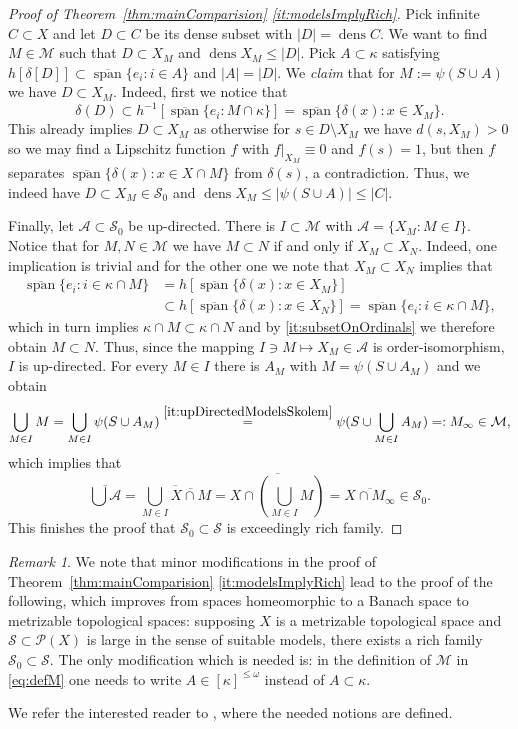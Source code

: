 \documentclass[11pt]{amsart}
\theoremstyle{definition}
\theoremstyle{remark}
\newtheorem{remark}[thm]{Remark}
\newcommand{\A}{\mathcal A}
\newcommand{\M}{\mathcal M}
\newcommand{\PP}{\mathcal P}
\newcommand{\SSS}{\mathcal S}
\newcommand{\closedSpan}{\overline{\operatorname{span}}}
\def \dens {\operatorname{dens}}
\begin{document}
\begin{proof}[Proof of Theorem~\ref{thm:mainComparision} \eqref{it:modelsImplyRich}]
Pick infinite $C\subset X$ and let $D\subset C$ be its dense subset with $|D| = \dens C$. We want to find $M\in\M$ such that $D\subset X_M$ and $\dens X_M\leq |D|$. Pick $A\subset \kappa$ satisfying $h[\delta[D]]\subset \closedSpan\{e_i\colon i\in A\}$ and $|A| = |D|$. We \emph{claim} that for $M:=\psi(S\cup A)$ we have $D\subset X_M$. Indeed, first we notice that
\[
\delta(D)\subset h^{-1}[\closedSpan\{e_i\colon M\cap\kappa\}] = \closedSpan\{\delta(x)\colon x\in X_M\}.
\]
This already implies $D\subset X_M$ as otherwise for $s\in D\setminus X_M$ we have $d(s,X_M)>0$ so we may find a Lipschitz function $f$ with $f|_{X_M}\equiv 0$ and $f(s)=1$, but then $f$ separates $\closedSpan\{\delta(x)\colon x\in X\cap M\}$ from $\delta(s)$, a contradiction. Thus, we indeed have $D\subset X_M\in\SSS_0$ and $\dens X_M\leq |\psi(S\cup A)| \leq |C|$. 

Finally, let $\A\subset \SSS_0$ be up-directed. There is $I\subset \M$ with $\A = \{X_M\colon M\in I\}$. Notice that for $M,N\in \M$ we have $M\subset N$ if and only if $X_M\subset X_N$. Indeed, one implication is trivial and for the other one we note that $X_M\subset X_N$ implies that
\[\begin{split}
\closedSpan\{e_i\colon i\in \kappa\cap M\} & = h[\closedSpan\{\delta(x)\colon x\in X_M\}]\\
& \subset h[\closedSpan\{\delta(x)\colon x\in X_N\}] = \closedSpan\{e_i\colon i\in \kappa\cap M\},
\end{split}\]
which in turn implies $\kappa\cap M\subset \kappa\cap N$ and by \eqref{it:subsetOnOrdinals} we therefore obtain $M\subset N$. Thus, since the mapping $I\ni M\mapsto X_M\in \A$ is order-isomorphism, $I$ is up-directed. For every $M\in I$ there is $A_M$ with $M = \psi(S\cup A_M)$ and we obtain
\[
\bigcup_{M\in I} M = \bigcup_{M\in I}\psi(S\cup A_M) \stackrel{\eqref{it:upDirectedModelsSkolem}}{=} \psi(S\cup \bigcup_{M\in I} A_M) =: M_\infty\in \M,
\]
which implies that
\[
\overline{\bigcup \A} = \overline{\bigcup_{M\in I} \overline{X\cap M}} = \overline{X\cap (\bigcup_{M\in I} M)} = \overline{X\cap M_{\infty}}\in \SSS_0.
\]
This finishes the proof that $\SSS_0\subset \SSS$ is exceedingly rich family.
\end{proof}

\begin{remark}\label{rem:comparisionSeparable}
We note that minor modifications in the proof of Theorem~\ref{thm:mainComparision} \eqref{it:modelsImplyRich} lead to the proof of the following, which improves \cite[Theorem 15]{C18} from spaces homeomorphic to a Banach space to metrizable topological spaces: supposing $X$ is a metrizable topological space and $\SSS\subset \PP(X)$ is large in the sense of suitable models, there exists a rich family $\SSS_0\subset \SSS$. The only modification which is needed is: in the definition of $\M$ in \eqref{eq:defM} one needs to write $A\in [\kappa]^{\leq \omega}$ instead of $A\subset \kappa$.

We refer the interested reader to \cite{C18}, where the needed notions are defined.
\end{remark}
\end{document}
